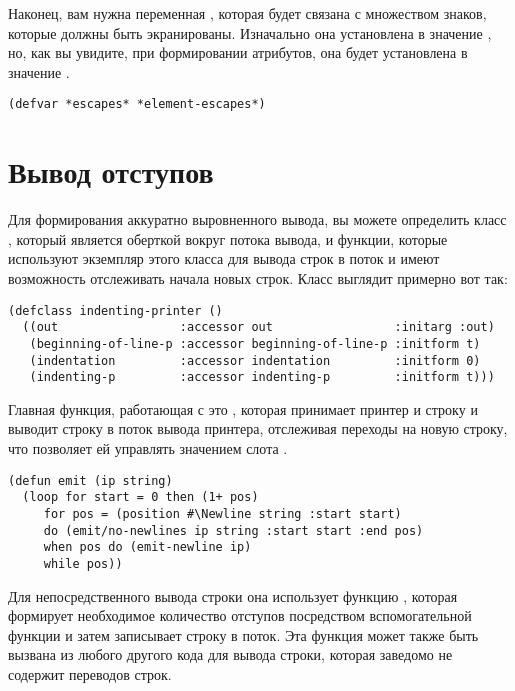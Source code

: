Наконец, вам нужна переменная , которая будет связана с множеством знаков,
которые должны быть экранированы. Изначально она установлена в значение
, но, как вы увидите, при формировании атрибутов, она будет
установлена в значение .

\begin{lstlisting}
(defvar *escapes* *element-escapes*)
\end{lstlisting}

\section{Вывод отступов}

Для формирования аккуратно выровненного вывода, вы можете определить класс
, который является оберткой вокруг потока вывода, и функции,
которые используют экземпляр этого класса для вывода строк в поток и имеют возможность
отслеживать начала новых строк. Класс выглядит примерно вот так:

\begin{lstlisting}
(defclass indenting-printer ()
  ((out                 :accessor out                 :initarg :out)
   (beginning-of-line-p :accessor beginning-of-line-p :initform t)
   (indentation         :accessor indentation         :initform 0)
   (indenting-p         :accessor indenting-p         :initform t)))
\end{lstlisting}

Главная функция, работающая с  это , которая принимает
принтер и строку и выводит строку в поток вывода принтера, отслеживая переходы на новую
строку, что позволяет ей управлять значением слота .

\begin{lstlisting}
(defun emit (ip string)
  (loop for start = 0 then (1+ pos)
     for pos = (position #\Newline string :start start)
     do (emit/no-newlines ip string :start start :end pos)
     when pos do (emit-newline ip)
     while pos))
\end{lstlisting}

Для непосредственного вывода строки она использует функцию ,
которая формирует необходимое количество отступов посредством вспомогательной функции
 и затем записывает строку в поток.  Эта функция может также
быть вызвана из любого другого кода для вывода строки, которая заведомо не содержит
переводов строк.

